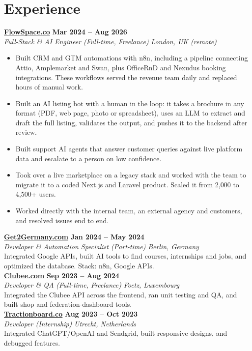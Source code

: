 \documentclass[a4paper,10pt]{article}
\newcommand{\role}[4]{%
 \textbf{#1} \hfill \textbf{#2}\\[1pt]%
 \textit{#3} \hfill \textit{#4}\\[2pt]%
}
\begin{document}
\section{Experience}

\role{\href{https://flowspace.co}{FlowSpace.co}}{Mar 2024 -- Aug 2026}{Full-Stack \& AI Engineer (Full-time, Freelance)}{London, UK (remote)}
\begin{itemize}
 \item Built CRM and GTM automations with n8n, including a pipeline connecting Attio, Amplemarket and Swan, plus OfficeRnD and Nexudus booking integrations. These workflows served the revenue team daily and replaced hours of manual work.
 \item Built an AI listing bot with a human in the loop: it takes a brochure in any format (PDF, web page, photo or spreadsheet), uses an LLM to extract and draft the full listing, validates the output, and pushes it to the backend after review.
 \item Built support AI agents that answer customer queries against live platform data and escalate to a person on low confidence.
 \item Took over a live marketplace on a legacy stack and worked with the team to migrate it to a coded Next.js and Laravel product. Scaled it from 2,000 to 4,500+ users.
 \item Worked directly with the internal team, an external agency and customers, and resolved issues end to end.
\end{itemize}

\role{\href{https://get2germany.com}{Get2Germany.com}}{Jan 2024 -- May 2024}{Developer \& Automation Specialist (Part-time)}{Berlin, Germany}
Integrated Google APIs, built AI tools to find courses, internships and jobs, and optimized the database. Stack: n8n, Google APIs.\\[1pt]

\role{\href{https://clubee.com}{Clubee.com}}{Sep 2023 -- Aug 2024}{Developer \& QA (Full-time, Freelance)}{Foetz, Luxembourg}
Integrated the Clubee API across the frontend, ran unit testing and QA, and built shop and federation-dashboard tools.\\[1pt]

\role{\href{https://tractionboard.co}{Tractionboard.co}}{Aug 2023 -- Oct 2023}{Developer (Internship)}{Utrecht, Netherlands}
Integrated ChatGPT/OpenAI and Sendgrid, built responsive designs, and debugged features.
\end{document}
